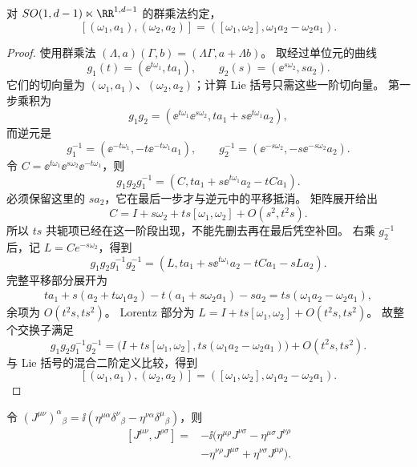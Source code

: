 \begin{proposition}
对 $SO(1,d-1)\ltimes\RR^{1,d-1}$ 的群乘法约定，\[[(\omega_1,a_1),(\omega_2,a_2)]=([\omega_1,\omega_2],\omega_1a_2-\omega_2a_1).\]
\end{proposition}

\begin{proof}
使用群乘法 $(\Lambda,a)(\Gamma,b)=(\Lambda\Gamma,a+\Lambda b)$。
取经过单位元的曲线
\[
g_1(t)=(\ee^{t\omega_1},ta_1),\qquad
g_2(s)=(\ee^{s\omega_2},sa_2).
\]
它们的切向量为 $(\omega_1,a_1)$、$(\omega_2,a_2)$；计算 Lie 括号只需这些一阶切向量。
第一步乘积为
\[
g_1g_2=(\ee^{t\omega_1}\ee^{s\omega_2},ta_1+s \ee^{t\omega_1}a_2),
\]
而逆元是
\[
g_1^{-1}=(\ee^{-t\omega_1},-t \ee^{-t\omega_1}a_1),\qquad
g_2^{-1}=(\ee^{-s\omega_2},-s \ee^{-s\omega_2}a_2).
\]
令 $C=\ee^{t\omega_1}\ee^{s\omega_2}\ee^{-t\omega_1}$，则
\[
g_1g_2g_1^{-1}=(C,ta_1+s \ee^{t\omega_1}a_2-tCa_1).
\]
必须保留这里的 $sa_2$，它在最后一步才与逆元中的平移抵消。
矩阵展开给出
\[
C=I+s\omega_2+ts[\omega_1,\omega_2]+O(s^2,t^2s).
\]
所以 $ts$ 共轭项已经在这一阶段出现，不能先删去再在最后凭空补回。
右乘 $g_2^{-1}$ 后，记 $L=Ce^{-s\omega_2}$，得到
\[
g_1g_2g_1^{-1}g_2^{-1}
=(L,ta_1+s \ee^{t\omega_1}a_2-tCa_1-sLa_2).
\]
完整平移部分展开为
\[
\begin{aligned}
ta_1+s(a_2+t\omega_1a_2)
-t(a_1+s\omega_2a_1)-sa_2
=ts(\omega_1a_2-\omega_2a_1),
\end{aligned}
\]
余项为 $O(t^2s,ts^2)$。
Lorentz 部分为 $L=I+ts[\omega_1,\omega_2]+O(t^2s,ts^2)$。
故整个交换子满足
\[
g_1g_2g_1^{-1}g_2^{-1}
=\bigl(I+ts[\omega_1,\omega_2],ts(\omega_1a_2-\omega_2a_1)\bigr)
+O(t^2s,ts^2).
\]
与 Lie 括号的混合二阶定义比较，得到
\begin{equation}\label{eq:ms-poincare-unified-bracket}
{[(\omega_1,a_1),(\omega_2,a_2)]
=([\omega_1,\omega_2],\omega_1a_2-\omega_2a_1).}
\end{equation}
\end{proof}

\begin{proposition}
令 $(J^{\mu\nu})^\alpha{}_{\beta}=\ii(\eta^{\mu\alpha}\delta^\nu{}_{\beta}-\eta^{\nu\alpha}\delta^\mu{}_{\beta})$，则\[\begin{aligned}{}[J^{\mu\nu},J^{\rho\sigma}]={}&-\ii(\eta^{\mu\rho}J^{\nu\sigma}-\eta^{\mu\sigma}J^{\nu\rho}\\&-\eta^{\nu\rho}J^{\mu\sigma}+\eta^{\nu\sigma}J^{\mu\rho}).\end{aligned}\]
\end{proposition}

